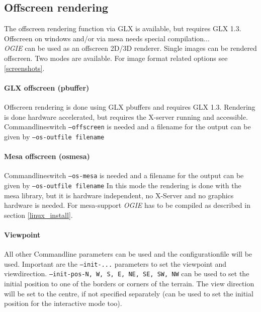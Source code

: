 \subsection{Offscreen rendering}

The offscreen rendering function via GLX is available, but requires GLX 1.3. Offscreen on windows and/or via mesa needs
special compilation... \\

\emph{OGIE} can be used as an offscreen 2D/3D renderer. 
Single images can be rendered offscreen. Two modes are available. For image format related options see \ref{screenshots}.

\paragraph{GLX offscreen (pbuffer)}
Offscreen rendering is done using GLX pbuffers and requires GLX 1.3. Rendering is done hardware accelerated, but requires the X-server running and accessible.
Commandlineswitch \texttt{--offscreen} is needed and
a filename for the output can be given by \texttt{--os-outfile filename}

\paragraph{Mesa offscreen (osmesa)}
Commandlineswitch \texttt{--os-mesa} is needed and
a filename for the output can be given by \texttt{--os-outfile filename}
In this mode the rendering is done with the mesa library, but it is hardware independent, no X-Server and no graphics hardware is needed.
For mesa-support \emph{OGIE} has to be compiled as described in section \ref{linux_install}.

\paragraph{Viewpoint}
All other Commandline parameters can be used and the configurationfile will be used.
Important are the \texttt{--init-...} parameters to set the viewpoint and viewdirection.
\texttt{--init-pos-N, W, S, E, NE, SE, SW, NW}  can be used to set the initial position to one
of the borders or corners of the terrain. The view direction will be set to the
centre, if not specified separately (can be used to set the initial position for
the interactive mode too).





